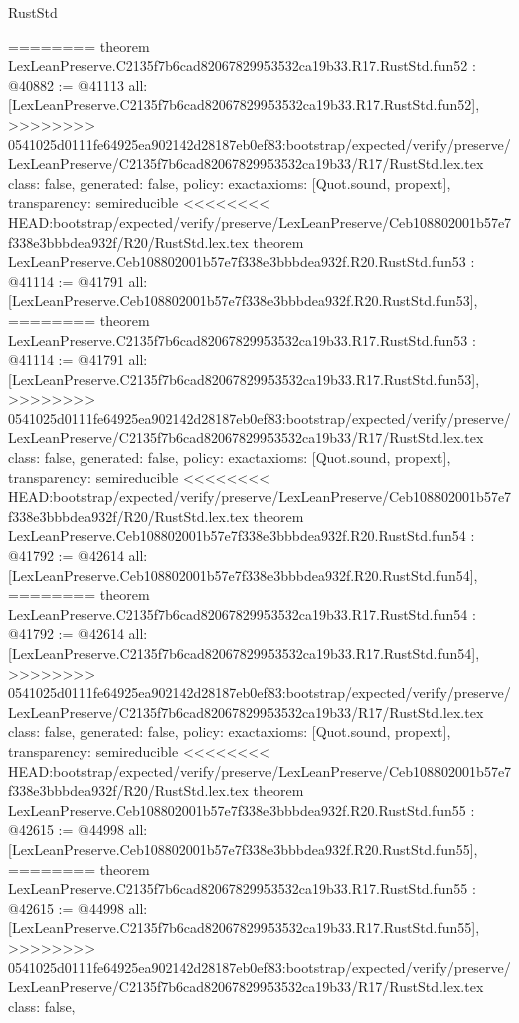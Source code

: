 \begin{lexlean}{RustStd}
\begin{coremodule}
{\begin{coremodule}
{{{{{{{{{{{{{{{{{{{{{{{{{{{{{{{{{{{{{{{{{{{{{{{{{{{{{{{========
theorem LexLeanPreserve.C2135f7b6cad82067829953532ca19b33.R17.RustStd.fun52 : @40882 := @41113 {
  all: [LexLeanPreserve.C2135f7b6cad82067829953532ca19b33.R17.RustStd.fun52],
>>>>>>>> 0541025d0111fe64925ea902142d28187eb0ef83:bootstrap/expected/verify/preserve/LexLeanPreserve/C2135f7b6cad82067829953532ca19b33/R17/RustStd.lex.tex
  class: false,
  generated: false,
  policy: exact{axioms: [Quot.sound, propext]},
  transparency: semireducible
}
<<<<<<<< HEAD:bootstrap/expected/verify/preserve/LexLeanPreserve/Ceb108802001b57e7f338e3bbbdea932f/R20/RustStd.lex.tex
theorem LexLeanPreserve.Ceb108802001b57e7f338e3bbbdea932f.R20.RustStd.fun53 : @41114 := @41791 {
  all: [LexLeanPreserve.Ceb108802001b57e7f338e3bbbdea932f.R20.RustStd.fun53],
========
theorem LexLeanPreserve.C2135f7b6cad82067829953532ca19b33.R17.RustStd.fun53 : @41114 := @41791 {
  all: [LexLeanPreserve.C2135f7b6cad82067829953532ca19b33.R17.RustStd.fun53],
>>>>>>>> 0541025d0111fe64925ea902142d28187eb0ef83:bootstrap/expected/verify/preserve/LexLeanPreserve/C2135f7b6cad82067829953532ca19b33/R17/RustStd.lex.tex
  class: false,
  generated: false,
  policy: exact{axioms: [Quot.sound, propext]},
  transparency: semireducible
}
<<<<<<<< HEAD:bootstrap/expected/verify/preserve/LexLeanPreserve/Ceb108802001b57e7f338e3bbbdea932f/R20/RustStd.lex.tex
theorem LexLeanPreserve.Ceb108802001b57e7f338e3bbbdea932f.R20.RustStd.fun54 : @41792 := @42614 {
  all: [LexLeanPreserve.Ceb108802001b57e7f338e3bbbdea932f.R20.RustStd.fun54],
========
theorem LexLeanPreserve.C2135f7b6cad82067829953532ca19b33.R17.RustStd.fun54 : @41792 := @42614 {
  all: [LexLeanPreserve.C2135f7b6cad82067829953532ca19b33.R17.RustStd.fun54],
>>>>>>>> 0541025d0111fe64925ea902142d28187eb0ef83:bootstrap/expected/verify/preserve/LexLeanPreserve/C2135f7b6cad82067829953532ca19b33/R17/RustStd.lex.tex
  class: false,
  generated: false,
  policy: exact{axioms: [Quot.sound, propext]},
  transparency: semireducible
}
<<<<<<<< HEAD:bootstrap/expected/verify/preserve/LexLeanPreserve/Ceb108802001b57e7f338e3bbbdea932f/R20/RustStd.lex.tex
theorem LexLeanPreserve.Ceb108802001b57e7f338e3bbbdea932f.R20.RustStd.fun55 : @42615 := @44998 {
  all: [LexLeanPreserve.Ceb108802001b57e7f338e3bbbdea932f.R20.RustStd.fun55],
========
theorem LexLeanPreserve.C2135f7b6cad82067829953532ca19b33.R17.RustStd.fun55 : @42615 := @44998 {
  all: [LexLeanPreserve.C2135f7b6cad82067829953532ca19b33.R17.RustStd.fun55],
>>>>>>>> 0541025d0111fe64925ea902142d28187eb0ef83:bootstrap/expected/verify/preserve/LexLeanPreserve/C2135f7b6cad82067829953532ca19b33/R17/RustStd.lex.tex
  class: false,
}}}}}}}}}}}}}}}}}}}}}}}}}}}}}}}}}}}}}}}}}}}}}}}}}}}}}}}}}}}
\end{coremodule}}
\end{coremodule}
\end{lexlean}
